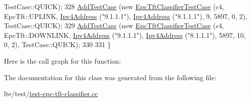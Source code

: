 \begin{DoxyCode}
      TestCase::QUICK);
328   \hyperlink{classns3_1_1TestCase_a3718088e3eefd5d6454569d2e0ddd835}{AddTestCase} (\textcolor{keyword}{new} \hyperlink{classEpcTftClassifierTestCase}{EpcTftClassifierTestCase} (c4, EpcTft::UPLINK,   
      \hyperlink{classns3_1_1Ipv4Address}{Ipv4Address} (\textcolor{stringliteral}{"9.1.1.1"}), \hyperlink{classns3_1_1Ipv4Address}{Ipv4Address} (\textcolor{stringliteral}{"8.1.1.1"}),     9,     5897,     0,    2), 
      TestCase::QUICK);
329   \hyperlink{classns3_1_1TestCase_a3718088e3eefd5d6454569d2e0ddd835}{AddTestCase} (\textcolor{keyword}{new} \hyperlink{classEpcTftClassifierTestCase}{EpcTftClassifierTestCase} (c4, EpcTft::DOWNLINK, 
      \hyperlink{classns3_1_1Ipv4Address}{Ipv4Address} (\textcolor{stringliteral}{"9.1.1.1"}), \hyperlink{classns3_1_1Ipv4Address}{Ipv4Address} (\textcolor{stringliteral}{"8.1.1.1"}),  5897,       10,     0,    2), 
      TestCase::QUICK);
330 
331 \}
\end{DoxyCode}


Here is the call graph for this function\+:




The documentation for this class was generated from the following file\+:\begin{DoxyCompactItemize}
\item 
lte/test/\hyperlink{test-epc-tft-classifier_8cc}{test-\/epc-\/tft-\/classifier.\+cc}\end{DoxyCompactItemize}
